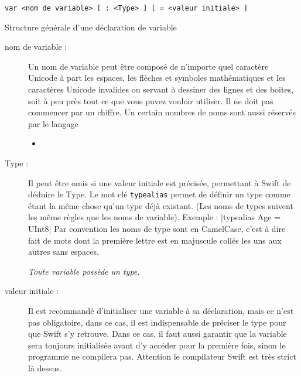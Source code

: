 \begin{listing}[h]
\begin{verbatim}
var <nom de variable> [ : <Type> ] [ = <valeur initiale> ]
\end{verbatim}
\caption{Structure générale d'une déclaration de variable}
\end{listing}

\begin{description}

\item[nom de variable :]
Un nom de variable peut être composé de n'importe quel caractère Unicode
à part les espaces, les flèches et symboles mathématiques et les
caractères Unicode invalides ou servant à dessiner des lignes et des boites,
soit à peu près tout ce que vous puvez vouloir utiliser.
Il ne doit pas commencer par un chiffre.
Un certain nombres de noms sont aussi réservés par le langage%

\begin{itemize}
\item \texttt{}
\end{itemize}

\item[Type :] Il peut être omis si une valeur initiale est précisée,
permettant à Swift de déduire le Type.
Le mot clé \texttt{typealias} permet de définir un type
comme étant la même chose qu'un type déjà existant.
(Les noms de types suivent les même règles que les noms de variable).
Exemple :
|typealias Age = UInt8|
Par convention les noms de type sont en CamelCase,
c'est à dire fait de mots dont la première lettre est en majuscule
collés les uns aux autres sans espaces.

\emph{Toute variable possède un type.}

\item[valeur initiale :]
Il est recommandé d'initialiser une variable à sa déclaration,
mais ce n'est pas obligatoire,
dans ce cas, il est indispensable de préciser le type pour que Swift s'y retrouve. 
Dans ce cas, il faut aussi garantir que la variable sera toujours initialisée
avant d'y accéder pour la première fois, sinon le programme ne compilera pas.
Attention le compilateur Swift est très strict là dessus.
\end{description}

